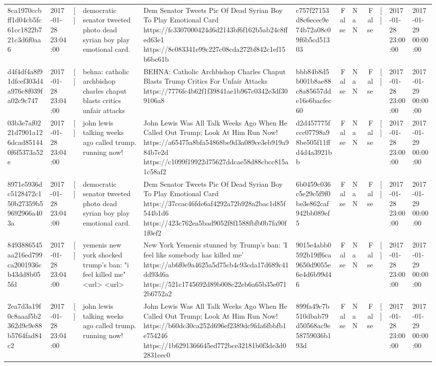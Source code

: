 \begin{tabular}{llllllrlrlll}
8ca1970ccbff1d04cb5fc61cc1822b721c3d6f0aa6 & 2017-01-28 23:04:00 & [] & democratic senator tweeted photo dead syrian boy play emotional card. & Dem Senator Tweets Pic Of Dead Syrian Boy To Play Emotional Card https://fc3307000424d6d2143bf6f162b5ab24c8ffed63e1 https://8c083341e99c227c08cda272bf842c1ef15b6bc61b & c757f27153d8c6ecec9e74b72a08c09f6b5cd51303 & False & NaN & False & [] & 2017-01-28 23:00:00 & 2017-01-29 00:00:00 \\
d4f4df4a8f91dfcef303d4a976c8f039fa02c9c747 & 2017-01-28 23:04:00 & [] & behna: catholic archbishop charles chaput blasts critics unfair attacks & BEHNA: Catholic Archbishop Charles Chaput Blasts Trump Critics For Unfair Attacks https://7776fc4b62f1f39841ae1b967c0342e3df309106a8 & bbb84b8d5b001b8ae88c8a85657dde16e6bacfec60 & False & NaN & False & [] & 2017-01-28 23:00:00 & 2017-01-29 00:00:00 \\
03b3e7af0221d7901a126dcad851440f6f5373a52e & 2017-01-28 23:04:00 & [] & john lewis talking weeks ago called trump. running now! & John Lewis Was All Talk Weeks Ago When He Called Out Trump; Look At Him Run Now! https://a65475a8bfa54868be9d3a089ce3eb919a984b7e2d https://c1099f19922d75627ddcae58d88cbcc815a1c58af2 & d2d457775fccc07798a98be505f11ffd4d4a3921bb & False & NaN & False & [] & 2017-01-28 23:00:00 & 2017-01-29 00:00:00 \\
8971e5936dc5128472c150b27359b59692966a403a & 2017-01-28 23:04:00 & [] & democratic senator tweeted photo dead syrian boy play emotional card. & Dem Senator Tweets Pic Of Dead Syrian Boy To Play Emotional Card https://37ccac46fde6af4292a72b928a2bac1d85f544b1d6 https://423c762ea5bad9052f8f1588fbfb0b7fa90f1f0ef2 & 6b0459c036c5e29c5f9f0be3e862caf942bb089ef5 & False & NaN & False & [] & 2017-01-28 23:00:00 & 2017-01-29 00:00:00 \\
8493886545aa216ed799ca2001936cb43dd8b055fd & 2017-01-28 23:04:00 & [] & yemenis new york shocked trump's ban: "i feel killed me" <url> <url> & New York Yemenis stunned by Trump's ban: 'I feel like somebody has killed me' https://ab6f0e9a4625a5d75cb4c93cda17d689c41dd93d6a https://521c1745692d89b008c22eb6a65b35e0712b6752a2 & 9015e4abb0592b19ff6ca9650d9055e6e4d6b99d46 & False & NaN & False & [] & 2017-01-28 23:00:00 & 2017-01-29 00:00:00 \\
2ea7d3a19f0c8aaaf5b2362d9c9e88b5764fad84c2 & 2017-01-28 23:04:00 & [] & john lewis talking weeks ago called trump. running now! & John Lewis Was All Talk Weeks Ago When He Called Out Trump; Look At Him Run Now! https://b60dc30ca252d696ef2389dc9fda6fbbfb1e754246 https://1b6291366645ed772bce32181b0f3de3d02831eec0 & 899fa49c7b510dbab79d50568ac9e58759036b193d & False & NaN & False & [] & 2017-01-28 23:00:00 & 2017-01-29 00:00:00 \\

\end{tabular}
